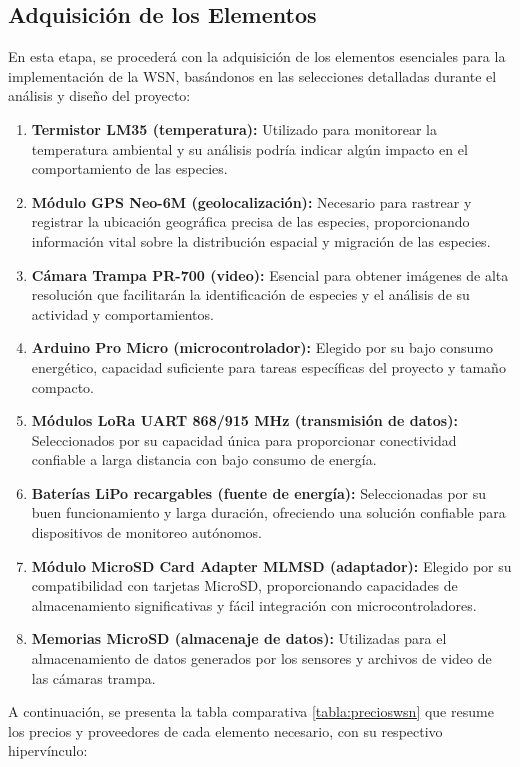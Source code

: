 \subsection{Adquisición de los Elementos}
En esta etapa, se procederá con la adquisición de los elementos esenciales para la implementación de la WSN, basándonos en las selecciones detalladas durante el análisis y diseño del proyecto:
\begin{enumerate}
    \item \textbf{Termistor LM35 (temperatura):} Utilizado para monitorear la temperatura ambiental y su análisis podría indicar algún impacto en el comportamiento de las especies.
    \item \textbf{Módulo GPS Neo-6M (geolocalización):} Necesario para rastrear y registrar la ubicación geográfica precisa de las especies, proporcionando información vital sobre la distribución espacial y migración de las especies.
    \item \textbf{Cámara Trampa PR-700 (video): } Esencial para obtener imágenes de alta resolución que facilitarán la identificación de especies y el análisis de su actividad y comportamientos.
    \item \textbf{Arduino Pro Micro (microcontrolador):} Elegido por su bajo consumo energético, capacidad suficiente para tareas específicas del proyecto y tamaño compacto.
    \item \textbf{Módulos LoRa UART 868/915 MHz (transmisión de datos):} Seleccionados por su capacidad única para proporcionar conectividad confiable a larga distancia con bajo consumo de energía.
    \item \textbf{Baterías LiPo recargables (fuente de energía):} Seleccionadas por su buen funcionamiento y larga duración, ofreciendo una solución confiable para dispositivos de monitoreo autónomos.
    \item \textbf{Módulo MicroSD Card Adapter MLMSD (adaptador):} Elegido por su compatibilidad con tarjetas MicroSD, proporcionando capacidades de almacenamiento significativas y fácil integración con microcontroladores.
    \item \textbf{Memorias MicroSD (almacenaje de datos):} Utilizadas para el almacenamiento de datos generados por los sensores y archivos de video de las cámaras trampa.
\end{enumerate}
A continuación, se presenta la tabla comparativa \ref{tabla:precioswsn} que resume los precios y proveedores de cada elemento necesario, con su respectivo hipervínculo:

